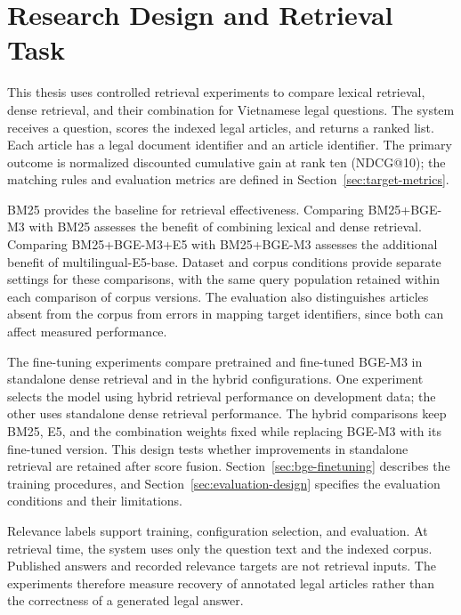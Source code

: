 \section{Research Design and Retrieval Task}
\label{sec:research-design}

This thesis uses controlled retrieval experiments to compare lexical retrieval, dense retrieval, and their combination for Vietnamese legal questions. The system receives a question, scores the indexed legal articles, and returns a ranked list. Each article has a legal document identifier and an article identifier. The primary outcome is normalized discounted cumulative gain at rank ten (NDCG@10); the matching rules and evaluation metrics are defined in Section~\ref{sec:target-metrics}.

BM25 provides the baseline for retrieval effectiveness. Comparing BM25+BGE-M3 with BM25 assesses the benefit of combining lexical and dense retrieval. Comparing BM25+BGE-M3+E5 with BM25+BGE-M3 assesses the additional benefit of multilingual-E5-base. Dataset and corpus conditions provide separate settings for these comparisons, with the same query population retained within each comparison of corpus versions. The evaluation also distinguishes articles absent from the corpus from errors in mapping target identifiers, since both can affect measured performance.

The fine-tuning experiments compare pretrained and fine-tuned BGE-M3 in standalone dense retrieval and in the hybrid configurations. One experiment selects the model using hybrid retrieval performance on development data; the other uses standalone dense retrieval performance. The hybrid comparisons keep BM25, E5, and the combination weights fixed while replacing BGE-M3 with its fine-tuned version. This design tests whether improvements in standalone retrieval are retained after score fusion. Section~\ref{sec:bge-finetuning} describes the training procedures, and Section~\ref{sec:evaluation-design} specifies the evaluation conditions and their limitations.

Relevance labels support training, configuration selection, and evaluation. At retrieval time, the system uses only the question text and the indexed corpus. Published answers and recorded relevance targets are not retrieval inputs. The experiments therefore measure recovery of annotated legal articles rather than the correctness of a generated legal answer.

